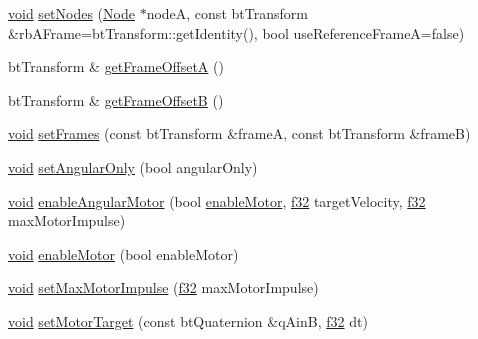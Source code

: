 \begin{DoxyCompactItemize}
\item 
\mbox{\hyperlink{_thread_8h_af1e856da2e658414cb2456cb6f7ebc66}{void}} \mbox{\hyperlink{classnjli_1_1_physics_constraint_hinge_a26455b3460d3cd8581359bab0f4fcc94}{set\+Nodes}} (\mbox{\hyperlink{classnjli_1_1_node}{Node}} $\ast$nodeA, const bt\+Transform \&rb\+A\+Frame=bt\+Transform\+::get\+Identity(), bool use\+Reference\+FrameA=false)
\item 
bt\+Transform \& \mbox{\hyperlink{classnjli_1_1_physics_constraint_hinge_ac86b8f0002f7f8325fa6732badfac191}{get\+Frame\+OffsetA}} ()
\item 
bt\+Transform \& \mbox{\hyperlink{classnjli_1_1_physics_constraint_hinge_a0e5e723a10746f7f7b7a188c972017aa}{get\+Frame\+OffsetB}} ()
\item 
\mbox{\hyperlink{_thread_8h_af1e856da2e658414cb2456cb6f7ebc66}{void}} \mbox{\hyperlink{classnjli_1_1_physics_constraint_hinge_ad4be215d7284b01d8122f0bf770c391f}{set\+Frames}} (const bt\+Transform \&frameA, const bt\+Transform \&frameB)
\item 
\mbox{\hyperlink{_thread_8h_af1e856da2e658414cb2456cb6f7ebc66}{void}} \mbox{\hyperlink{classnjli_1_1_physics_constraint_hinge_a29156cea121d2887e74204e3bbb79adf}{set\+Angular\+Only}} (bool angular\+Only)
\item 
\mbox{\hyperlink{_thread_8h_af1e856da2e658414cb2456cb6f7ebc66}{void}} \mbox{\hyperlink{classnjli_1_1_physics_constraint_hinge_a3fb601299961f642b0b26ace87759e5d}{enable\+Angular\+Motor}} (bool \mbox{\hyperlink{classnjli_1_1_physics_constraint_hinge_ab51a1cffbd35fd20709566467fa22bd7}{enable\+Motor}}, \mbox{\hyperlink{_util_8h_a5f6906312a689f27d70e9d086649d3fd}{f32}} target\+Velocity, \mbox{\hyperlink{_util_8h_a5f6906312a689f27d70e9d086649d3fd}{f32}} max\+Motor\+Impulse)
\item 
\mbox{\hyperlink{_thread_8h_af1e856da2e658414cb2456cb6f7ebc66}{void}} \mbox{\hyperlink{classnjli_1_1_physics_constraint_hinge_ab51a1cffbd35fd20709566467fa22bd7}{enable\+Motor}} (bool enable\+Motor)
\item 
\mbox{\hyperlink{_thread_8h_af1e856da2e658414cb2456cb6f7ebc66}{void}} \mbox{\hyperlink{classnjli_1_1_physics_constraint_hinge_ae923a5eb9ea4e2d19471b448e61ebfa8}{set\+Max\+Motor\+Impulse}} (\mbox{\hyperlink{_util_8h_a5f6906312a689f27d70e9d086649d3fd}{f32}} max\+Motor\+Impulse)
\item 
\mbox{\hyperlink{_thread_8h_af1e856da2e658414cb2456cb6f7ebc66}{void}} \mbox{\hyperlink{classnjli_1_1_physics_constraint_hinge_adf853f9c76676b2f6bc13f8f8196ce4b}{set\+Motor\+Target}} (const bt\+Quaternion \&q\+AinB, \mbox{\hyperlink{_util_8h_a5f6906312a689f27d70e9d086649d3fd}{f32}} dt)

\end{DoxyCompactItemize}
